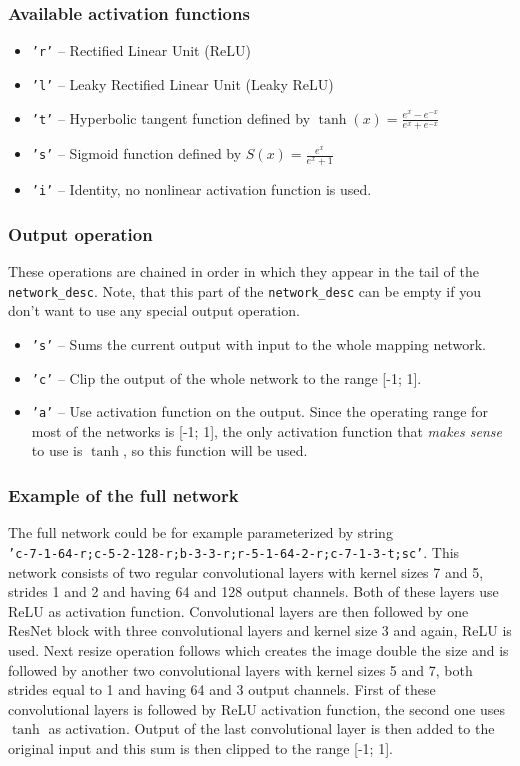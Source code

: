 \subsubsection{Available activation functions}

\begin{itemize}
\item \texttt{'r'} -- Rectified Linear Unit (ReLU)~\cite{relu}
\item \texttt{'l'} -- Leaky Rectified Linear Unit (Leaky ReLU)~\cite{leakyrelu}
\item \texttt{'t'} -- Hyperbolic tangent function defined by $\tanh(x) = \frac{e^x - e^{-x}}{e^x + e^{-x}}$
\item \texttt{'s'} -- Sigmoid function defined by $S(x) = \frac{e^x}{e^x + 1}$
\item \texttt{'i'} -- Identity, no nonlinear activation function is used.
\end{itemize}

\subsubsection{Output operation}

These operations are chained in order in which they appear in the tail of the \texttt{network\_desc}. Note, that this part of the \texttt{network\_desc} can be empty if you don't want to use any special output operation.
\begin{itemize}
\item \texttt{'s'} -- Sums the current output with input to the whole mapping network.
\item \texttt{'c'} -- Clip the output of the whole network to the range [-1; 1].
\item \texttt{'a'} -- Use activation function on the output. Since the operating range for most of the networks is [-1; 1], the only activation function that {\em makes sense} to use is $\tanh$, so this function will be used.
\end{itemize}

\subsubsection{Example of the full network}

The full network could be for example parameterized by string\\\texttt{'c-7-1-64-r;c-5-2-128-r;b-3-3-r;r-5-1-64-2-r;c-7-1-3-t;sc'}. This network consists of two regular convolutional layers with kernel sizes 7 and 5, strides 1 and 2 and having 64 and 128 output channels. Both of these layers use ReLU as activation function. Convolutional layers are then followed by one ResNet block with three convolutional layers and kernel size 3 and again, ReLU is used. Next resize operation follows which creates the image double the size and is followed by another two convolutional layers with kernel sizes 5 and 7, both strides equal to 1 and having 64 and 3 output channels. First of these convolutional layers is followed by ReLU activation function, the second one uses $\tanh$ as activation. Output of the last convolutional layer is then added to the original input and this sum is then clipped to the range [-1; 1].

